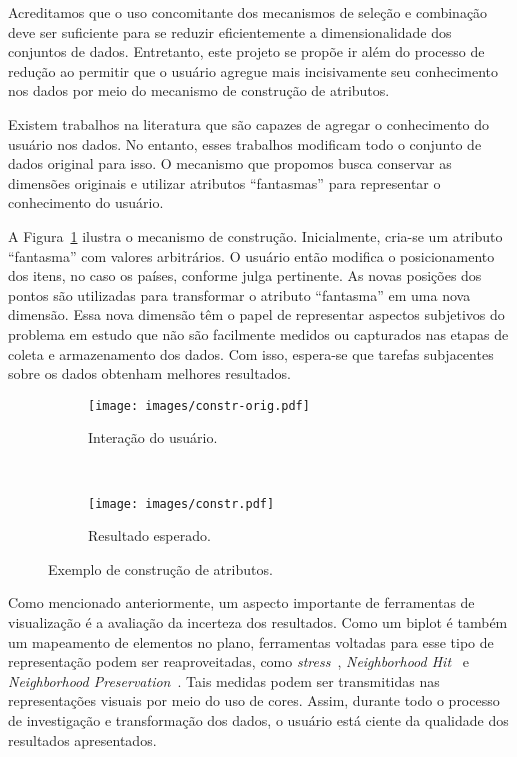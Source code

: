 Acreditamos que o uso concomitante dos mecanismos de seleção
e combinação deve ser suficiente para se reduzir
eficientemente a dimensionalidade dos conjuntos de dados.
Entretanto, este projeto se propõe ir além do processo de
redução ao permitir que o usuário agregue mais incisivamente
seu conhecimento nos dados por meio do mecanismo de
construção de atributos.

Existem trabalhos na literatura que são capazes de agregar
o conhecimento do usuário nos dados. No entanto, esses
trabalhos modificam todo o conjunto de dados original para
isso. O mecanismo que propomos busca conservar as dimensões
originais e utilizar atributos ``fantasmas'' para
representar o conhecimento do usuário.

A Figura~\ref{fig:constr} ilustra o mecanismo de construção.
Inicialmente, cria-se um atributo ``fantasma'' com valores
arbitrários. O usuário então modifica o posicionamento dos
itens, no caso os países, conforme julga pertinente. As
novas posições dos pontos são utilizadas para transformar o
atributo ``fantasma'' em uma nova dimensão. Essa nova
dimensão têm o papel de representar aspectos subjetivos do
problema em estudo que não são facilmente medidos ou
capturados nas etapas de coleta e armazenamento dos dados.
Com isso, espera-se que tarefas subjacentes sobre os dados
obtenham melhores resultados. 

\begin{figure}[h!]
  \centering
  \begin{subfigure}[b]{0.45\textwidth}
    \centering
    \texttt{[image: images/constr-orig.pdf]}
    \caption{Interação do usuário.}
  \end{subfigure}%
  ~
  \begin{subfigure}[b]{0.45\textwidth}
    \centering
    \texttt{[image: images/constr.pdf]}
    \caption{Resultado esperado.}
  \end{subfigure} 
  \caption{Exemplo de construção de atributos.}
  \label{fig:constr}
\end{figure}

Como mencionado anteriormente, um aspecto importante de
ferramentas de visualização é a avaliação da incerteza dos
resultados. Como um biplot é também um mapeamento de
elementos no plano, ferramentas voltadas para esse tipo de
representação podem ser reaproveitadas, como
\emph{stress}~\cite{Kruskal1964}, \emph{Neighborhood
Hit}~\cite{Paulovich2008} e \emph{Neighborhood
Preservation}~\cite{Paulovich2008a}. Tais medidas
podem ser transmitidas nas representações visuais por meio
do uso de cores. Assim, durante todo o processo de
investigação e transformação dos dados, o usuário está
ciente da qualidade dos resultados apresentados. 

